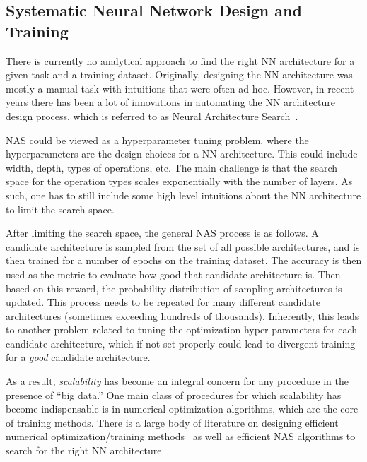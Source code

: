 \subsection{Systematic Neural Network Design and Training}
There is currently no analytical approach to find the right NN architecture for
a given task and a training dataset.
Originally, designing the NN architecture was mostly a manual task with
intuitions that were often ad-hoc. However, in recent years there has been
a lot of innovations in automating the NN architecture design process, which is 
referred to as Neural Architecture Search~\cite{zoph2016neural,pham2018efficient,tan2019mnasnet,liu2018darts,wu2019fbnet,cai2018proxylessnas,cai2019once}.

NAS could be viewed as a hyperparameter tuning problem, where the hyperparameters are
the design choices for a NN architecture. This could include
width, depth, types of operations, etc. The main challenge
is that the search space for the operation types scales exponentially with the number
of layers.
As such, one has to still include some high level intuitions about the NN architecture
to limit the search space. 

After limiting the search space, the general NAS process is as follows.
A candidate architecture is sampled from the set of all
possible architectures, and is then trained for a number of epochs on the training dataset.
The accuracy is then used 
as the metric to evaluate how good that candidate architecture is. Then based
on this reward, the probability distribution of sampling architectures is updated.
This process needs to be repeated for many different candidate architectures (sometimes exceeding
hundreds of thousands). 
Inherently, this leads to another problem related to tuning the optimization hyper-parameters
for each candidate architecture, which if not set properly could lead to divergent
training for a \emph{good} candidate architecture.


As a result, \emph{scalability} has become an integral concern for any procedure in the presence of ``big data.'' 
One main class of procedures for which scalability has become indispensable is in
numerical optimization algorithms, which are the core of training methods. 
There is a large body of literature on designing
efficient  numerical optimization/training methods~\cite{reddi2018adaptive,shazeer2018adafactor,zhang2019lookahead,park2020lookahead,zhuang2020adabelief,liu2020variance,ginsburg2020stochastic,yao2020adahessian,ma2020apollo,gupta2018shampoo} as well as efficient NAS algorithms to 
search for the right NN architecture~\cite{zoph2016neural,pham2018efficient,tan2019mnasnet,liu2018darts,wu2019fbnet}.

